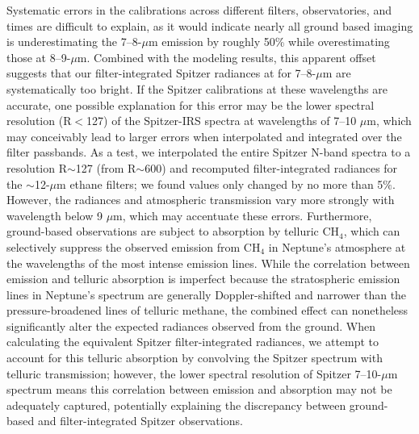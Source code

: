 \documentclass[twocolumn,10pt]{aastex631}
\begin{document}
Systematic errors in the calibrations across different filters, observatories, and times are difficult to explain, as it would indicate nearly all ground based imaging is underestimating the 7--8-$\mu$m emission by roughly 50\% while overestimating those at 8--9-$\mu$m.  Combined with the modeling results, this apparent offset suggests that our filter-integrated Spitzer radiances at for 7--8-$\mu$m are systematically too bright.  If the Spitzer calibrations at these wavelengths are accurate, one possible explanation for this error may be the lower spectral resolution (R$<$127) of the Spitzer-IRS spectra at wavelengths of 7--10 $\mu$m, which may conceivably lead to larger errors when interpolated and integrated over the filter passbands. As a test, we interpolated the entire Spitzer N-band spectra to a resolution R$\sim$127 (from R$\sim$600) and recomputed filter-integrated radiances for the $\sim$12-$\mu$m ethane filters; we found values only changed by no more than 5$\%$. However, the radiances and atmospheric transmission vary more strongly with wavelength below 9 $\mu$m, which may accentuate these errors. Furthermore, ground-based observations are subject to absorption by telluric CH$_4$, which can selectively suppress the observed emission from CH$_4$ in Neptune's atmosphere at the wavelengths of the most intense emission lines. While the correlation between emission and telluric absorption is imperfect because the stratospheric emission lines in Neptune’s spectrum are generally Doppler-shifted and narrower than the pressure-broadened lines of telluric methane, the combined effect can nonetheless significantly alter the expected radiances observed from the ground. When calculating the equivalent Spitzer filter-integrated radiances, we attempt to account for this telluric absorption by convolving the Spitzer spectrum with telluric transmission; however, the lower spectral resolution of Spitzer 7--10-$\mu$m spectrum means this correlation between emission and absorption may not be adequately captured, potentially explaining the discrepancy between ground-based and filter-integrated Spitzer observations. 

\end{document}
